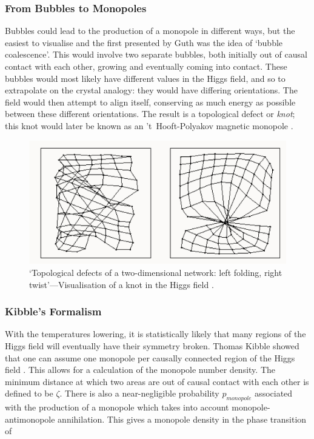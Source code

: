 \documentclass[fleqn, twocolumn, 10pt]{article}
\begin{document}
\subsubsection{From Bubbles to Monopoles}
Bubbles could lead to the production of a monopole in different ways, but the easiest to visualise and the first presented by Guth was the idea of `bubble coalescence'. This would involve two separate bubbles, both initially out of causal contact with each other, growing and eventually coming into contact. These bubbles would most likely have different values in the Higgs field, and so to extrapolate on the crystal analogy: they would have differing orientations. The field would then attempt to align itself, conserving as much energy as possible between these different orientations. The result is a topological defect or \textit{knot}; this knot would later be known as an 't~Hooft-Polyakov magnetic monopole \cite{guth1980early, tHooft1974gauge, polyakov1996particle}.
\begin{figure}[h]
\includegraphics[width=\linewidth]{Topological_defect.png}
\caption{`Topological defects of a two-dimensional network: left folding, right twist'---Visualisation of a knot in the Higgs field \cite{topological2005defect}.}
\end{figure}


\subsubsection{Kibble's Formalism} 
With the temperatures lowering, it is statistically likely that many regions of the Higgs field will eventually have their symmetry broken. Thomas Kibble showed that one can assume one monopole per causally connected region of the Higgs field \cite{kolb1990early, arrtu2013conf}. This allows for a calculation of the monopole number density. 
The minimum distance at which two areas are out of causal contact with each other is defined to be $\zeta$. There is also a near-negligible probability $p_{monopole}$ associated with the production of a monopole which takes into account monopole-antimonopole annihilation. This gives a monopole density in the phase transition of \cite{preskill1984magnetic, shi2013diss}
\end{document}
